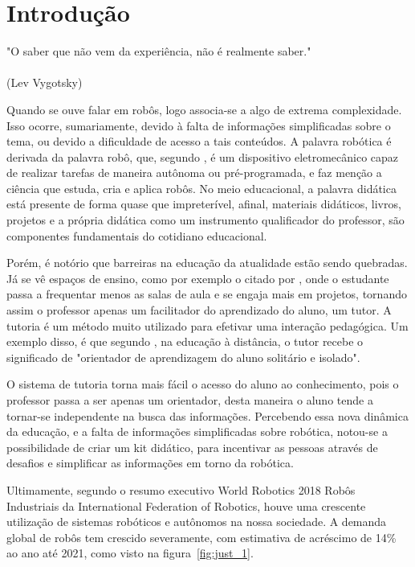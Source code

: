 \chapter{Introdução}
\label{chap:intro}
\begin{flushright}
	"O saber que não vem da experiência, não é realmente saber." \\
	\ \\
	(Lev Vygotsky)
\end{flushright}

Quando se ouve falar em robôs, logo associa-se a algo de extrema complexidade. Isso ocorre, sumariamente, devido à falta de informações simplificadas sobre o tema, ou devido a dificuldade de acesso a tais conteúdos. A palavra robótica é derivada da palavra robô, que, segundo \cite{goncalves2007}, é um dispositivo eletromecânico capaz de realizar tarefas de maneira autônoma ou pré-programada, e faz menção a ciência que estuda, cria e aplica robôs. 
No meio educacional, a palavra didática está presente de forma quase que impreterível, afinal, materiais didáticos, livros, projetos e a própria didática como um instrumento qualificador do professor, são componentes fundamentais do cotidiano educacional.

Porém, é notório que barreiras na educação da atualidade estão sendo quebradas. Já se vê espaços de ensino, como por exemplo o citado por \cite{Mataric}, onde o estudante passa a frequentar menos as salas de aula e se engaja mais em projetos, tornando assim o professor apenas um facilitador do aprendizado do aluno, um tutor. A tutoria é um método muito utilizado para efetivar uma interação pedagógica. Um exemplo disso, é que segundo \cite{sa1998}, na educação à distância, o tutor recebe o significado de "orientador de aprendizagem do aluno solitário e isolado".

O sistema de tutoria torna mais fácil o acesso do aluno ao conhecimento, pois o professor passa a ser apenas um orientador, desta maneira o aluno tende a tornar-se independente na busca das informações. Percebendo essa nova dinâmica da educação, e a falta de informações simplificadas sobre robótica, notou-se a possibilidade de criar um kit didático, para incentivar as pessoas através de desafios e simplificar as informações em torno da robótica.

Ultimamente, segundo o resumo executivo World Robotics 2018 Robôs Industriais da International Federation of Robotics\cite{ifr2018}, houve uma crescente utilização de sistemas robóticos e autônomos na nossa sociedade. A demanda global de robôs tem crescido severamente, com estimativa de acréscimo de 14\% ao ano até 2021, como visto na figura~\ref{fig:just_1}.

